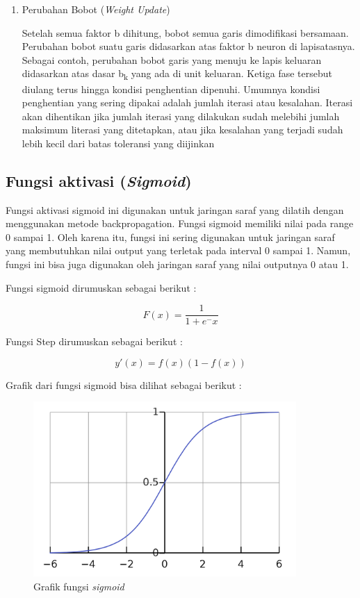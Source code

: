 \begin{enumerate}
	\item Perubahan Bobot (\emph{Weight Update}) \par 
	Setelah semua faktor b dihitung, bobot semua garis dimodifikasi bersamaan.
	Perubahan bobot suatu garis didasarkan atas faktor b neuron di lapisatasnya. Sebagai
	contoh, perubahan bobot garis yang menuju ke lapis keluaran didasarkan atas dasar b\textsubscript{k}
	yang ada di unit keluaran. Ketiga fase tersebut diulang terus hingga kondisi penghentian
	dipenuhi. Umumnya kondisi penghentian yang sering dipakai adalah jumlah iterasi atau
	kesalahan. Iterasi akan dihentikan jika jumlah iterasi yang dilakukan sudah melebihi
	jumlah maksimum literasi yang ditetapkan, atau jika kesalahan yang terjadi sudah lebih
	kecil dari batas toleransi yang diijinkan
	
\end{enumerate}

\subsection{Fungsi aktivasi (\emph{Sigmoid})}
Fungsi aktivasi sigmoid ini digunakan untuk jaringan saraf yang dilatih
dengan menggunakan metode backpropagation. Fungsi sigmoid memiliki nilai pada
range 0 sampai 1. Oleh karena itu, fungsi ini sering digunakan untuk jaringan saraf
yang membutuhkan nilai output yang terletak pada interval 0 sampai 1. Namun,
fungsi ini bisa juga digunakan oleh jaringan saraf yang nilai outputnya 0 atau 1. \par 
Fungsi sigmoid dirumuskan sebagai berikut :
\begin{center}
	$$ F(x) =  \frac{\mathrm{1} }{\mathrm{1} + e^-x }  $$ 
\end{center}

\newpage
\par 
Fungsi Step dirumuskan sebagai berikut : 
\begin{center}
	$$  𝑦′(𝑥) = 𝑓(𝑥)(1 − 𝑓(𝑥)) $$
\end{center}
\par 
Grafik dari fungsi sigmoid bisa dilihat sebagai berikut : 
\begin{figure}[H]
	\centering
	\includegraphics[width=10cm]{gambar/sigmoid}
	\caption{Grafik fungsi \emph{sigmoid}\protect\footnotemark}
	\label{JST-2}
\end{figure}

